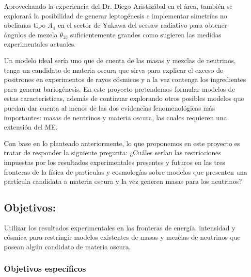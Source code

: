 \begin{leptogenesis}
  Aprovechando la experiencia del Dr. Diego Aristizábal en el área,
  también se explorará la posibilidad de generar leptogénesis e
  implementar simetrías no abelianas tipo $A_4$ en el sector de Yukawa
  del seesaw radiativo para obtener ángulos de mezcla $\theta_{13}$
  suficientemente grandes como sugieren las medidas experimentales
  actuales.
\end{leptogenesis}

Un modelo ideal sería uno que de cuenta de las masas y mezclas de
neutrinos, tenga un candidato de materia oscura que sirva para explicar
el exceso de positrones en experimentos de rayos cósmicos y a la vez
contenga los ingredientes para generar bariogénesis.  En este
proyecto pretendemos formular modelos de estas características, además
de continuar explorando otros posibles modelos que puedan dar cuenta
al menos de las dos evidencias fenomenológicas más importantes: masas
de neutrinos y materia oscura, las cuales requieren una extensión del
ME.


Con base en lo planteado anteriormente, lo que proponemos en este
proyecto es tratar de responder la siguiente pregunta: ¿Cuáles serían
las restricciones impuestas por los resultados experimentales
presentes y futuros en las tres fronteras de la física de partículas y
cosmologías sobre modelos que presenten una partícula candidata a
materia oscura y la vez generen masas para los neutrinos?
 

\subsection{Objetivos:                                     }
Utilizar los resultados experimentales en las fronteras de energía,
intensidad y cósmica para restringir modelos existentes de masas y
mezclas de neutrinos que posean algún candidato de materia oscura.

\subsubsection{Objetivos específicos}
\label{sec:objet-espec}

